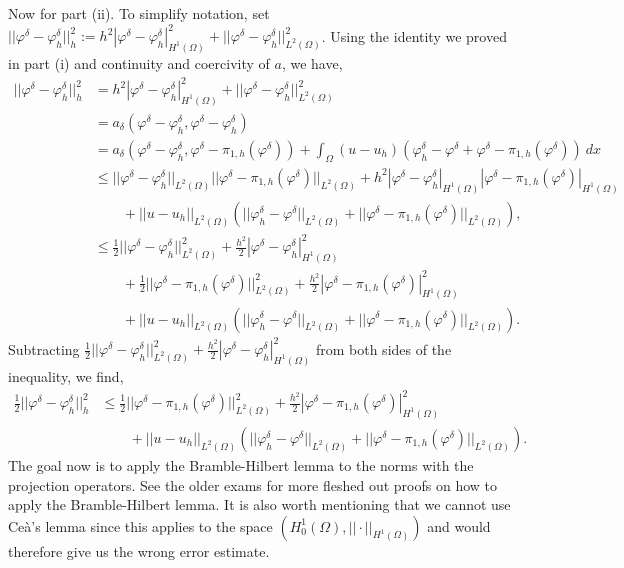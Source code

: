 \documentclass[11pt]{article}
\newcommand{\phid}{\varphi^\delta}
\begin{document}
Now for part (ii).
To simplify notation, set $||\phid - \phid_h||_h^2 := h^2 |\phid - \phid_h|^2_{H^1(\Omega)} + ||\phid - \phid_h||^2_{L^2(\Omega)}$.
Using the identity we proved in part (i) and continuity and coercivity of $a$, we have,
\begin{align*}
	||\phid - \phid_h||^2_h &= h^2 |\varphi^\delta - \varphi^\delta_h|^2_{H^1(\Omega)} + ||\varphi^\delta - \varphi^\delta_h ||^2_{L^2(\Omega)} \\
	&= a_{\delta}(\phid - \phid_h, \phid - \phid_h) \\
    	&= a_\delta(\phid - \phid_h, \phid - \pi_{1,h}(\phid)) + \int_\Omega (u - u_h) (\phid_h - \phid + \phid - \pi_{1,h}(\phid)) \: dx \\
    	&\leq ||\phid - \phid_h||_{L^2(\Omega)} ||\phid - \pi_{1,h}(\phid)||_{L^2(\Omega)} + h^2 |\phid - \phid_h|_{H^1(\Omega)} |\phid - \pi_{1,h}(\phid)|_{H^1(\Omega)}  \\
    	&\qquad + ||u - u_h||_{L^2(\Omega)} ( ||\phid_h - \phid||_{L^2(\Omega)} + ||\phid - \pi_{1,h}(\phid)||_{L^2(\Omega)}), \\
    	&\leq \frac{1}{2}||\phid - \phid_h||_{L^2(\Omega)}^2 + \frac{h^2}{2}|\phid - \phid_h|^2_{H^1(\Omega)} \\
    	&\qquad + \frac{1}{2}||\phid - \pi_{1,h}(\phid)||^2_{L^2(\Omega)} + \frac{h^2}{2} |\phid - \pi_{1,h}(\phid)|^2_{H^1(\Omega)} \\
	&\qquad + ||u - u_h||_{L^2(\Omega)}(||\phid_h - \phid||_{L^2(\Omega)} + ||\phid - \pi_{1,h}(\phid)||_{L^2(\Omega)}).
\end{align*}
Subtracting $\frac{1}{2}||\phid - \phid_h||_{L^2(\Omega)}^2 + \frac{h^2}{2}|\phid - \phid_h|^2_{H^1(\Omega)}$ from both sides of the inequality, we find,
\begin{equation}
\begin{split}
	\frac12 ||\phid - \phid_h||^2_h &\leq \frac{1}{2}||\phid - \pi_{1,h}(\phid)||^2_{L^2(\Omega)} + \frac{h^2}{2} |\phid - \pi_{1,h}(\phid)|^2_{H^1(\Omega)} \\
	&\qquad + ||u - u_h||_{L^2(\Omega)} (||\phid_h - \phid||_{L^2(\Omega)} + ||\phid - \pi_{1,h}(\phid)||_{L^2(\Omega)}).
\end{split}
\end{equation}
The goal now is to apply the Bramble-Hilbert lemma to the norms with the projection operators. 
See the older exams for more fleshed out proofs on how to apply the Bramble-Hilbert lemma.
It is also worth mentioning that we cannot use Ce\`{a}'s lemma since this applies to the space $(H^1_0(\Omega), ||\cdot||_{H^1(\Omega)})$ and would therefore give us the wrong error estimate.
\end{document}
